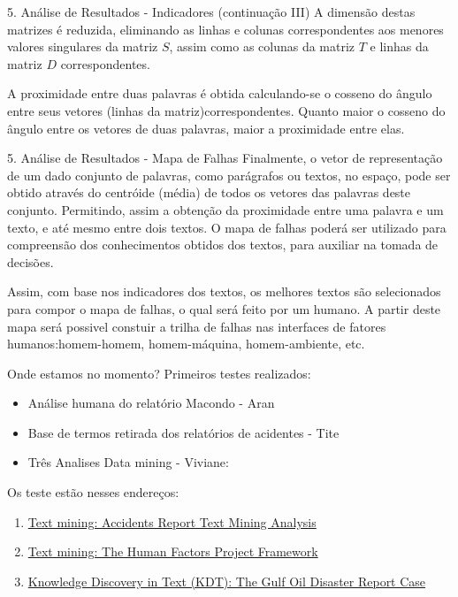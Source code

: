 \documentclass[
  ignorenonframetext,
]{beamer}
\begin{document}
\begin{frame}{5. Análise de Resultados - Indicadores (continuação III)}
\protect\hypertarget{anuxe1lise-de-resultados---indicadores-continuauxe7uxe3o-iii}{}
A dimensão destas matrizes é reduzida, eliminando as linhas e colunas
correspondentes aos menores valores singulares da matriz \(S\), assim
como as colunas da matriz \(T\) e linhas da matriz \(D\)
correspondentes.

A proximidade entre duas palavras é obtida calculando-se o cosseno do
ângulo entre seus vetores (linhas da matriz)correspondentes. Quanto
maior o cosseno do ângulo entre os vetores de duas palavras, maior a
proximidade entre elas.
\end{frame}

\begin{frame}{5. Análise de Resultados - Mapa de Falhas}
\protect\hypertarget{anuxe1lise-de-resultados---mapa-de-falhas}{}
Finalmente, o vetor de representação de um dado conjunto de palavras,
como parágrafos ou textos, no espaço, pode ser obtido através do
centróide (média) de todos os vetores das palavras deste conjunto.
Permitindo, assim a obtenção da proximidade entre uma palavra e um
texto, e até mesmo entre dois textos. O mapa de falhas poderá ser
utilizado para compreensão dos conhecimentos obtidos dos textos, para
auxiliar na tomada de decisões.

Assim, com base nos indicadores dos textos, os melhores textos são
selecionados para compor o mapa de falhas, o qual será feito por um
humano. A partir deste mapa será possivel constuir a trilha de falhas
nas interfaces de fatores humanos:homem-homem, homem-máquina,
homem-ambiente, etc.
\end{frame}

\begin{frame}{Onde estamos no momento?}
\protect\hypertarget{onde-estamos-no-momento}{}
Primeiros testes realizados:

\begin{itemize}[<+->]
\item
  Análise humana do relatório Macondo - Aran
\item
  Base de termos retirada dos relatórios de acidentes - Tite
\item
  Três Analises Data mining - Viviane:
\end{itemize}

Os teste estão nesses endereços:

\begin{enumerate}[<+->]
\item
  \href{https://rpubs.com/vivianesch/599127}{Text mining: Accidents
  Report Text Mining Analysis}
\item
  \href{https://rpubs.com/vivianesch/596134}{Text mining: The Human
  Factors Project Framework}
\item
  \href{https://rpubs.com/vivianesch/589395}{Knowledge Discovery in Text
  (KDT): The Gulf Oil Disaster Report Case}
\end{enumerate}
\end{frame}
\end{document}
